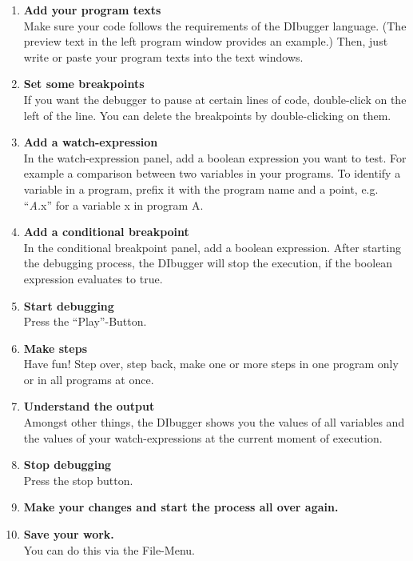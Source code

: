 \documentclass[parskip=full]{memoir}
\begin{document}
\begin{enumerate}
\item \textbf{Add your program texts} \\
Make sure your code follows the requirements of the DIbugger language. (The preview text in the left program window provides an example.) Then, just write or paste your program texts into the text windows.
\item \textbf{Set some breakpoints} \\
If you want the debugger to pause at certain lines of code, double-click on the left of the line. You can delete the breakpoints by double-clicking on them.
\item \textbf{Add a watch-expression} \\
In the watch-expression panel, add a boolean expression you want to test. For example a comparison between two variables in your programs. To identify a variable in a program, prefix it with the program name and a point, e.g. \enquote{\textit{A.}x} for a variable x in program A.
\item \textbf{Add a conditional breakpoint} \\
In the conditional breakpoint panel, add a boolean expression. After starting the debugging process, the DIbugger will stop the execution, if the boolean expression evaluates to true.
\item \textbf{Start debugging }\\
Press the \enquote{Play}-Button. 
\item \textbf{Make steps} \\
Have fun! Step over, step back, make one or more steps in one program only or in all programs at once.
\item \textbf{Understand the output} \\
Amongst other things, the DIbugger shows you the values of all variables and the values of your watch-expressions at the current moment of execution.
\item \textbf{Stop debugging }\\
Press the stop button.
\item \textbf{Make your changes and start the process all over again.} \\
\item \textbf{Save your work.} \\
You can do this via the File-Menu. \\\\\\
\end{enumerate}
\end{document}
